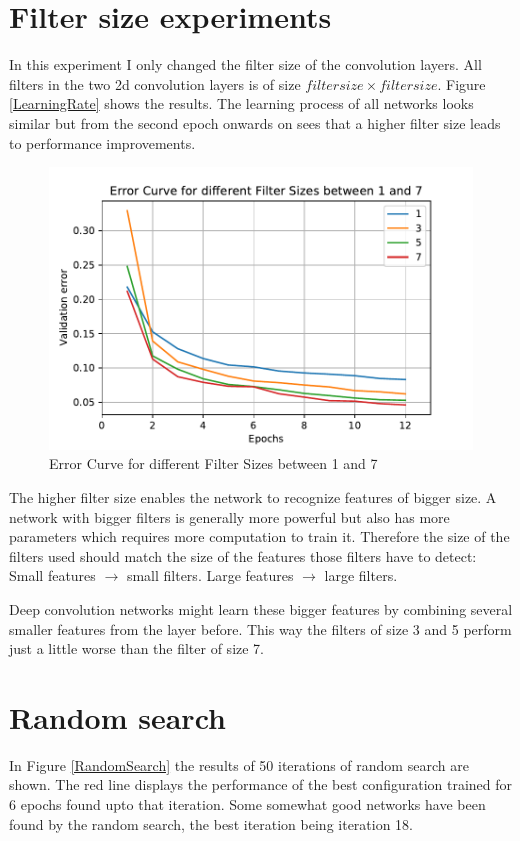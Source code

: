 \documentclass[
        a4paper,
        10pt,
        parskip = full,    %
    ]{scrartcl}
\begin{document}
\section{Filter size experiments}
In this experiment I only changed the filter size of the convolution layers. All
filters in the two 2d convolution layers is of size $filtersize \times filtersize$.
Figure \ref{LearningRate} shows the results. The learning process of all networks
looks similar but from the second epoch onwards on sees that a higher filter size
leads to performance improvements.

\begin{figure}[H]
	\includegraphics{../images/Error_curve_for_Filter_Sizes.pdf}
	\caption{Error Curve for different Filter Sizes between 1 and 7}
  \label{FilterSize}
\end{figure}
 The higher filter size enables the network to recognize features of bigger size.
 A network with bigger filters is generally more powerful but also has more
 parameters which requires more computation to train it. Therefore the size of
 the filters used should match the size of the features those filters have to
 detect: Small features $\rightarrow$ small filters. Large features $\rightarrow$
 large filters.

 Deep convolution networks might learn these bigger features by combining
 several smaller features from the layer before. This way the filters of size 3
 and 5 perform just a little worse than the filter of size 7.

\section{Random search}
In Figure \ref{RandomSearch} the results of 50 iterations of random search are
shown. The red line displays the performance of the best configuration trained
for 6 epochs found upto that iteration. Some somewhat good networks have been
found by the random search, the best iteration being iteration 18.
\end{document}
